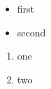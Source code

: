 \begin{itemize}
  \item first
  \item second
\end{itemize}
\begin{enumerate}
  \item one
  \item two
\end{enumerate}
